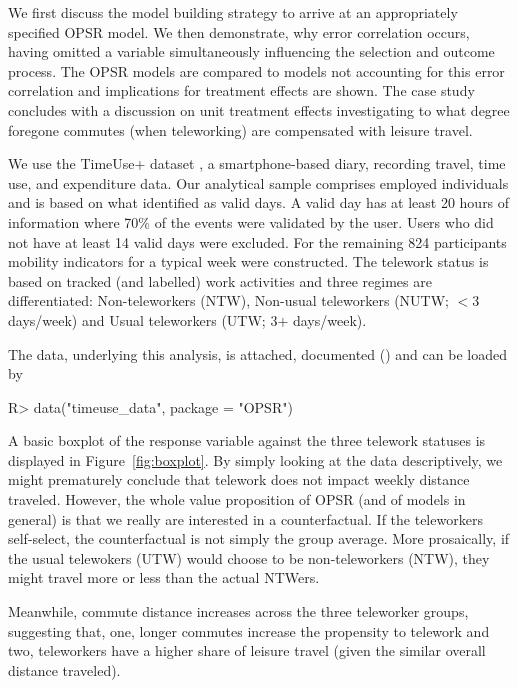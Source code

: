 \documentclass[%
    twoside, openright, titlepage, numbers=noenddot,%
    cleardoublepage=empty,%
    abstract=false,%
    BCOR=5.5mm, paper=a5, fontsize=10pt,%
]{scrreprt}
\begin{document}
We first discuss the model building strategy to arrive at an appropriately specified OPSR model. We then demonstrate, why error correlation occurs, having omitted a variable simultaneously influencing the selection and outcome process. The OPSR models are compared to models not accounting for this error correlation and implications for treatment effects are shown. The case study concludes with a discussion on unit treatment effects investigating to what degree foregone commutes (when teleworking) are compensated with leisure travel.

We use the TimeUse+ dataset \citep{Winkler+Meister+Axhausen:2024}, a smartphone-based diary, recording travel, time use, and expenditure data. Our analytical sample comprises employed individuals and is based on what \citet{Winkler+Axhausen:2024} identified as valid days. A valid day has at least 20 hours of information where 70\% of the events were validated by the user. Users who did not have at least 14 valid days were excluded. For the remaining 824 participants mobility indicators for a typical week were constructed. The telework status is based on tracked (and labelled) work activities and three regimes are differentiated: Non-teleworkers (NTW), Non-usual teleworkers (NUTW; $<$3 days/week) and Usual teleworkers (UTW; 3$+$ days/week).

The data, underlying this analysis, is attached, documented () and can be loaded by
%
\begin{Schunk}
\begin{Sinput}
R> data("timeuse_data", package = "OPSR")
\end{Sinput}
\end{Schunk}
%
A basic boxplot of the response variable against the three telework statuses is displayed in Figure~\ref{fig:boxplot}. By simply looking at the data descriptively, we might prematurely conclude that telework does not impact weekly distance traveled. However, the whole value proposition of OPSR (and of models in general) is that we really are interested in a counterfactual. If the teleworkers self-select, the counterfactual is not simply the group average. More prosaically, if the usual telewokers (UTW) would choose to be non-teleworkers (NTW), they might travel more or less than the actual NTWers.

Meanwhile, commute distance increases across the three teleworker groups, suggesting that, one, longer commutes increase the propensity to telework and two, teleworkers have a higher share of leisure travel (given the similar overall distance traveled).
\end{document}

